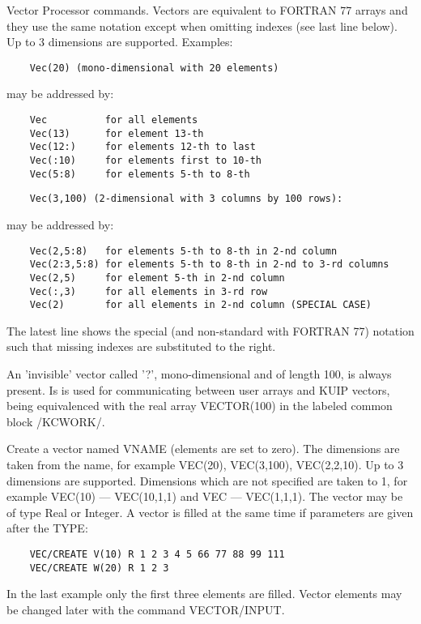 \ENDCMD
{}
\ifMENUtext
   \par
Vector Processor commands.  Vectors are equivalent to FORTRAN 77 arrays and 
   they use the same notation except when omitting indexes (see last line 
   below).  Up to 3 dimensions are supported. Examples:  
\begin{verbatim}
    Vec(20) (mono-dimensional with 20 elements)
\end{verbatim}
   \par
may be addressed by:  
\begin{verbatim}
    Vec          for all elements
    Vec(13)      for element 13-th
    Vec(12:)     for elements 12-th to last
    Vec(:10)     for elements first to 10-th
    Vec(5:8)     for elements 5-th to 8-th
\end{verbatim}
\begin{verbatim}
    Vec(3,100) (2-dimensional with 3 columns by 100 rows):
\end{verbatim}
   \par
may be addressed by:  
\begin{verbatim}
    Vec(2,5:8)   for elements 5-th to 8-th in 2-nd column
    Vec(2:3,5:8) for elements 5-th to 8-th in 2-nd to 3-rd columns
    Vec(2,5)     for element 5-th in 2-nd column
    Vec(:,3)     for all elements in 3-rd row
    Vec(2)       for all elements in 2-nd column (SPECIAL CASE)
\end{verbatim}
   \par
The latest line shows the special (and non-standard with FORTRAN 77) 
   notation such that missing indexes are substituted to the right.  

   \par
An 'invisible' vector called '?', mono-dimensional and of length 100, is 
   always present. Is is used for communicating between user arrays and KUIP 
   vectors, being equivalenced with the real array VECTOR(100) in the labeled 
   common block /KCWORK/.  


\fi


\BEGARG
{}
\ENDARG
{}
\ENDOPT

   \par
Create a vector named VNAME (elements are set to zero).  The dimensions are 
   taken from the name, for example VEC(20), VEC(3,100), VEC(2,2,10).  Up to 3 
   dimensions are supported. Dimensions which are not specified are taken to 
   1, for example VEC(10) ---\KET{} VEC(10,1,1) and VEC ---\KET{} VEC(1,1,1).  
   The vector may be of type Real or Integer.  A vector is filled at the same 
   time if parameters are given after the TYPE:  
\begin{verbatim}
    VEC/CREATE V(10) R 1 2 3 4 5 66 77 88 99 111
    VEC/CREATE W(20) R 1 2 3
\end{verbatim}
   \par
In the last example only the first three elements are filled.  Vector 
   elements may be changed later with the command VECTOR/INPUT.  


